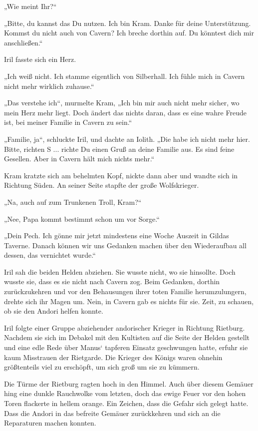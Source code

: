 „Wie meint Ihr?“

„Bitte, du kannst das Du nutzen. Ich bin Kram. Danke für deine Unterstützung. Kommst du nicht auch von Cavern? Ich breche dorthin auf. Du könntest dich mir anschließen.“

Iril fasste sich ein Herz.

„Ich weiß nicht. Ich stamme eigentlich von Silberhall. Ich fühle mich in Cavern nicht mehr wirklich zuhause.“

„Das verstehe ich“, murmelte Kram, „Ich bin mir auch nicht mehr sicher, wo mein Herz mehr liegt. Doch ändert das nichts daran, dass es eine wahre Freude ist, bei meiner Familie in Cavern zu sein.“

„Familie, ja“, schluckte Iril, und dachte an Iolith. „Die habe ich nicht mehr hier. Bitte, richten S ... richte Du einen Gruß an deine Familie aus. Es sind feine Gesellen. Aber in Cavern hält mich nichts mehr.“

Kram kratzte sich am behelmten Kopf, nickte dann aber und wandte sich in Richtung Süden. An seiner Seite stapfte der große Wolfskrieger.

„Na, auch auf zum Trunkenen Troll, Kram?“

„Nee, Papa kommt bestimmt schon um vor Sorge.“

„Dein Pech. Ich gönne mir jetzt mindestens eine Woche Auszeit in Gildas Taverne. Danach können wir uns Gedanken machen über den Wiederaufbau all dessen, das vernichtet wurde.“

Iril sah die beiden Helden abziehen. Sie wusste nicht, wo sie hinsollte. Doch wusste sie, dass es sie nicht nach Cavern zog. Beim Gedanken, dorthin zurückzukehren und vor den Behausungen ihrer toten Familie herumzulungern, drehte sich ihr Magen um. Nein, in Cavern gab es nichts für sie. Zeit, zu schauen, ob sie den Andori helfen konnte.



\trennzeichen



Iril folgte einer Gruppe abziehender andorischer Krieger in Richtung Rietburg. Nachdem sie sich im Debakel mit den Kultisten auf die Seite der Helden gestellt und eine edle Rede über Manus‘ tapferen Einsatz geschwungen hatte, erfuhr sie kaum Misstrauen der Rietgarde. Die Krieger des Königs waren ohnehin größtenteils viel zu erschöpft, um sich groß um sie zu kümmern.

Die Türme der Rietburg ragten hoch in den Himmel. Auch über diesem Gemäuer hing eine dunkle Rauchwolke vom letzten, doch das ewige Feuer vor den hohen Toren flackerte in hellem orange. Ein Zeichen, dass die Gefahr sich gelegt hatte. Dass die Andori in das befreite Gemäuer zurückkehren und sich an die Reparaturen machen konnten.

